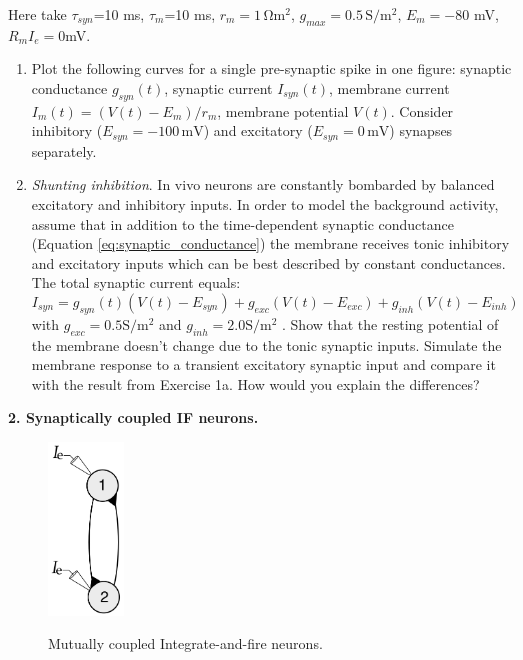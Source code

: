 \documentclass[12pt]{article}
\begin{document}
 Here take $\tau_{syn}$=10 ms, $\tau_m$=10 ms, $r_m=1\,\mathrm{\Omega m^2}$,
$g_{max}=0.5\,\mathrm{S/m^2}$, $E_m=-80$ mV, $R_m I_e=0$mV.
 
\begin{enumerate}
    \item \label{ex:syncurrent} Plot the following curves for a single
        pre-synaptic spike in one figure:
        synaptic conductance $g_{syn}(t)$, synaptic current
        $I_{syn}(t)$, membrane current $I_m(t)=(V(t)-E_m)/r_m$,
        membrane potential $V(t)$.
        Consider inhibitory ($E_{syn}=-100\,\mathrm{mV}$) and excitatory
        ($E_{syn}=0\,\mathrm{mV}$) synapses separately.
        \item \textit{Shunting inhibition}. In vivo neurons are constantly
        bombarded by balanced excitatory and inhibitory inputs. In order to
        model the background activity, assume that in addition to the
        time-dependent synaptic conductance (Equation
        \ref{eq:synaptic_conductance}) the membrane receives tonic inhibitory
        and excitatory inputs which can be best described by constant
        conductances. The total synaptic current equals:
        $$I_{syn}=g_{syn}(t)(V(t)-E_{syn})+g_{exc}(V(t)-E_{exc}) +
        g_{inh}(V(t)-E_{inh})$$
        with $g_{exc}= 0.5 \mathrm{S/m^2}$ and $g_{inh}= 2.0 \mathrm{S/m^2}$ .
        Show that the resting potential of the membrane doesn't change due to
        the tonic synaptic inputs. Simulate the membrane response to a
        transient excitatory synaptic input and compare it with the result from
        Exercise 1a. How would you explain the differences?

 \end{enumerate}
 
  \newpage
  \textbf{2. Synaptically coupled IF neurons.}

        \begin{figure}
          \centering
          \includegraphics[width=0.18\textwidth]{coupledIFs.png}
          \caption{Mutually coupled Integrate-and-fire neurons.}
          \noindent \hrulefill
          \label{fig:CoupledIFs}
        \end{figure}
\end{document}
